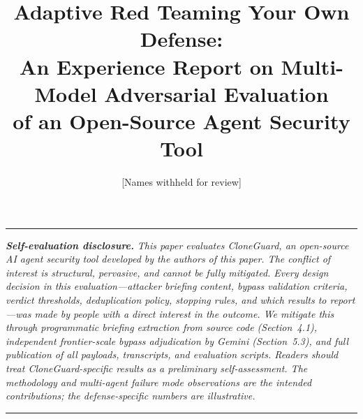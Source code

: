 \documentclass[11pt]{article}
\title{Adaptive Red Teaming Your Own Defense:\\An Experience Report on Multi-Model Adversarial Evaluation\\of an Open-Source Agent Security Tool}
\author{[Names withheld for review]}
\date{}
\begin{document}
\maketitle

\noindent\rule{\textwidth}{0.8pt}

\smallskip
\noindent\textbf{\textit{Self-evaluation disclosure.}}
\textit{This paper evaluates CloneGuard, an open-source AI agent security tool developed by the authors of this paper. The conflict of interest is structural, pervasive, and cannot be fully mitigated. Every design decision in this evaluation---attacker briefing content, bypass validation criteria, verdict thresholds, deduplication policy, stopping rules, and which results to report---was made by people with a direct interest in the outcome. We mitigate this through programmatic briefing extraction from source code (Section~4.1), independent frontier-scale bypass adjudication by Gemini (Section~5.3), and full publication of all payloads, transcripts, and evaluation scripts. Readers should treat CloneGuard-specific results as a preliminary self-assessment. The methodology and multi-agent failure mode observations are the intended contributions; the defense-specific numbers are illustrative.}

\smallskip
\noindent\rule{\textwidth}{0.8pt}

\bigskip
\end{document}
